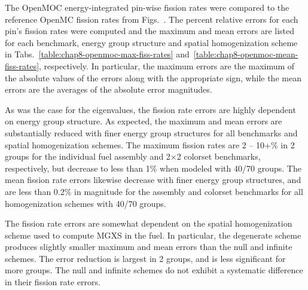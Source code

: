 The OpenMOC energy-integrated pin-wise fission rates were compared to the reference OpenMC fission rates from Figs.~. The percent relative errors for each pin's fission rates were computed and the maximum and mean errors are listed for each benchmark, energy group structure and spatial homogenization scheme in Tabs.~\ref{table:chap8-openmoc-max-fiss-rates} and~\ref{table:chap8-openmoc-mean-fiss-rates}, respectively. In particular, the maximum errors are the maximum of the absolute values of the errors along with the appropriate sign, while the mean errors are the averages of the absolute error magnitudes.

As was the case for the eigenvalues, the fission rate errors are highly dependent on energy group structure. As expected, the maximum and mean errors are substantially reduced with finer energy group structures for all benchmarks and spatial homogenization schemes. The maximum fission rates are 2 -- 10+\% in 2 groups for the individual fuel assembly and 2$\times$2 colorset benchmarks, respectively, but decrease to less than 1\% when modeled with 40/70 groups. The mean fission rate errors likewise decrease with finer energy group structures, and are less than 0.2\% in magnitude for the assembly and colorset benchmarks for all homogenization schemes with 40/70 groups.

The fission rate errors are somewhat dependent on the spatial homogenization scheme used to compute \ac{MGXS} in the fuel. In particular, the degenerate scheme produces slightly smaller maximum and mean errors than the null and infinite schemes. The error reduction is largest in 2 groups, and is less significant for more groups. The null and infinite schemes do not exhibit a systematic difference in their fission rate errors.


